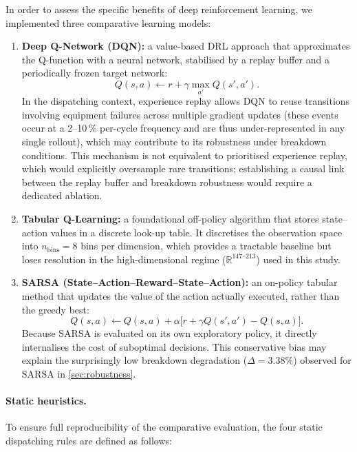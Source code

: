 \documentclass[11pt,a4paper]{article}
\begin{document}
In order to assess the specific benefits of deep reinforcement learning, we implemented three comparative learning models:

\begin{enumerate}
  \item \textbf{Deep Q-Network (DQN):} a value-based DRL approach that approximates the Q-function with a neural network, stabilised by a replay buffer and a periodically frozen target network:
  \begin{equation}
  Q(s,a) \leftarrow r + \gamma \max_{a'} Q(s', a') .
  \end{equation}
  In the dispatching context, experience replay allows DQN to reuse transitions involving equipment failures across multiple gradient updates (these events occur at a 2--10\,\% per-cycle frequency and are thus under-represented in any single rollout), which may contribute to its robustness under breakdown conditions. This mechanism is not equivalent to prioritised experience replay, which would explicitly oversample rare transitions; establishing a causal link between the replay buffer and breakdown robustness would require a dedicated ablation.

  \item \textbf{Tabular Q-Learning:} a foundational off-policy algorithm that stores state--action values in a discrete look-up table. It discretises the observation space into $n_{\text{bins}}=8$ bins per dimension, which provides a tractable baseline but loses resolution in the high-dimensional regime ($\mathbb{R}^{147\text{--}213}$) used in this study.

  \item \textbf{SARSA (State--Action--Reward--State--Action):} an on-policy tabular method that updates the value of the action actually executed, rather than the greedy best:
  \begin{equation}
  Q(s,a) \leftarrow Q(s,a) + \alpha \big[ r + \gamma Q(s',a') - Q(s,a) \big] .
  \end{equation}
  Because SARSA is evaluated on its own exploratory policy, it directly internalises the cost of suboptimal decisions. This conservative bias may explain the surprisingly low breakdown degradation ($\Delta=3.38\%$) observed for SARSA in \cref{sec:robustness}.
\end{enumerate}

\paragraph{Static heuristics.} To ensure full reproducibility of the comparative evaluation, the four static dispatching rules are defined as follows:
\end{document}
